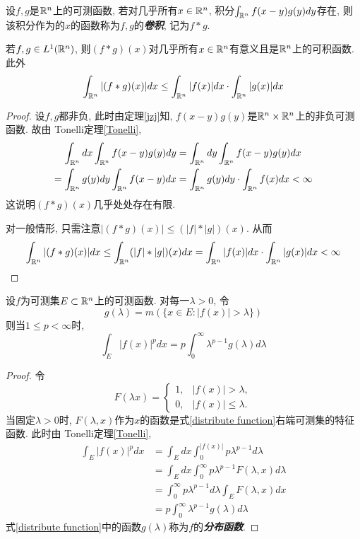 \documentclass[12pt, a4paper, oneside, UTF8]{ctexbook}  %
\begin{document}
\begin{defn}
    设$f, g$是$\mathbb{R}^n$上的可测函数, 若对几乎所有$x\in\mathbb{R}^n$, 积分$\int_{\mathbb{R}^n} f(x-y)g(y)dy$存在, 则该积分作为的$x$的函数称为$f, g$的\textbf{\emph{卷积}}, 记为$f*g$. 
\end{defn}


\begin{thm}
    若$f, g\in L^1(\mathbb{R}^n)$, 则$(f*g)(x)$对几乎所有$x\in\mathbb{R}^n$有意义且是$\mathbb{R}^n$上的可积函数. 此外
    $$ \int_{\mathbb{R}^n}|(f*g)(x)|dx \leq \int_{\mathbb{R}^n}|f(x)|dx \cdot \int_{\mathbb{R}^n}|g(x)|dx $$
\end{thm}


\begin{proof}
    设$f, g$都非负, 此时由定理\ref{jzj}知, $f(x-y)g(y)$是$\mathbb{R}^n\times\mathbb{R}^n$上的非负可测函数. 故由 Tonelli定理\ref{Tonelli}, 
    \begin{align*}
        \int_{\mathbb{R}^n}dx\int_{\mathbb{R}^n}f(x-y)g(y)dy& = \int_{\mathbb{R}^n}dy\int_{\mathbb{R}^n}f(x-y)g(y)dx  \\
        =\int_{\mathbb{R}^n}g(y)dy\int_{\mathbb{R}^n}f(x-y)dx& = \int_{\mathbb{R}^n}g(y)dy \cdot \int_{\mathbb{R}^n}f(x)dx < \infty
    \end{align*}
    这说明$(f*g)(x)$几乎处处存在有限. 
    \par 对一般情形, 只需注意$|(f*g)(x)|\leq (|f|*|g|)(x)$. 从而
    $$ \int_{\mathbb{R}^n}|(f*g)(x)|dx \leq \int_{\mathbb{R}^n}(|f|*|g|)(x)dx = \int_{\mathbb{R}^n}|f(x)|dx \cdot \int_{\mathbb{R}^n}|g(x)|dx < \infty$$
\end{proof}


\begin{thm}
    设$f$为可测集$E\subset \mathbb{R}^n$上的可测函数. 对每一$\lambda > 0$, 令
    \begin{equation}\label{distribute function}
        g(\lambda) = m(\{ x\in E: |f(x)| > \lambda \})
    \end{equation}
    则当$1\leq p <\infty$时, $$\int_{E} |f(x)|^p dx = p \int_{0}^\infty \lambda^{p-1}g(\lambda) d\lambda $$
\end{thm}


\begin{proof}
    令$$ F(\lambda x) = \left\{ \begin{array}{ll}1, & |f(x)| > \lambda, \\0, & |f(x)| \leq \lambda. \end{array}\right. $$
    当固定$\lambda > 0$时, $F(\lambda, x)$作为$x$的函数是式\ref{distribute function}右端可测集的特征函数. 此时由 Tonelli定理\ref{Tonelli}, 
    \begin{align*}
        \int_{E} |f(x)|^p dx& = \int_{E}dx\int_{0}^{|f(x)|} p\lambda^{p-1} d\lambda\\
                            & = \int_{E}dx\int_{0}^{\infty} p\lambda^{p-1}F(\lambda, x) d\lambda\\
                            & = \int_{0}^{\infty} p\lambda^{p-1} d\lambda\int_{E}F(\lambda, x)dx \\
                            & = p \int_{0}^\infty \lambda^{p-1}g(\lambda) d\lambda
    \end{align*}
    式\ref{distribute function}中的函数$g(\lambda)$称为$f$的\textbf{\emph{分布函数}}. 
\end{proof}


\ifx\allfiles\undefined
\end{document}
